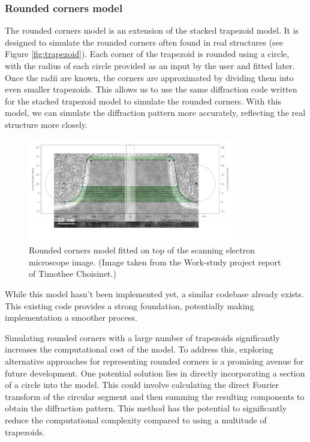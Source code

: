 \medskip

\subsubsection{Rounded corners model}

The rounded corners model is an extension of the stacked trapezoid model. It is designed to 
simulate the rounded corners often found in real structures (see Figure \ref{fig:trapezoid}). 
Each corner of the trapezoid is rounded using a circle, with the radius of each circle provided 
as an input by the user and fitted later. Once the radii are known, the corners are approximated 
by dividing them into even smaller trapezoids. This allows us to use the same diffraction code written for the
 stacked trapezoid model to simulate the rounded corners. With this model, we can simulate the 
 diffraction pattern more accurately, reflecting the real structure more closely.

\begin{figure}[h]
    \centering
    \includegraphics[width=0.8\textwidth]{images/rounded.PNG}
    \caption{Rounded corners model fitted on top of the scanning electron microscope image. (Image taken from the Work-study project report of Timothee Choisinet.) }
    \label{fig:rounded_corners}
\end{figure}

\medskip

While this model hasn't been implemented yet, a similar codebase already exists. This existing
code provides a strong foundation, potentially making implementation a smoother process.

\medskip

Simulating rounded corners with a large number of trapezoids significantly increases the 
computational cost of the model. To address this, exploring alternative approaches for representing 
rounded corners is a promising avenue for future development. One potential solution lies in 
directly incorporating a section of a circle into the model. This could involve calculating the 
direct Fourier transform of the circular segment and then summing the resulting components to obtain the 
diffraction pattern. This method has the potential to significantly reduce the computational 
complexity compared to using a multitude of trapezoids.

